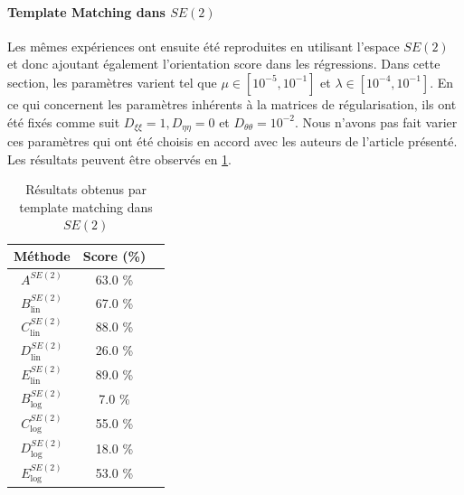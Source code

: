 \documentclass{article}
\begin{document}
\paragraph{Template Matching dans $SE(2)$}
Les mêmes expériences ont ensuite été reproduites en utilisant l'espace $SE(2)$ et donc ajoutant également l'orientation score dans les régressions.
Dans cette section, les paramètres varient tel que $\mu \in [10^{-5}, 10^{-1}]$ et $\lambda \in [10^{-4}, 10^{-1}]$. En ce qui concernent les paramètres inhérents à la matrices de 
régularisation, ils ont été fixés comme suit $D_{\xi \xi}=1, D_{\eta \eta} = 0$ et $D_{\theta \theta} = 10^{-2}$. Nous n'avons pas fait varier ces paramètres qui ont été choisis en accord avec les auteurs 
de l'article présenté. Les résultats peuvent être observés en \ref{table: SE(2)}.

\begin{table}[h!]
    \centering
    \begin{tabular}{|c|c|c|}
        \hline
        Méthode & Score (\%)\\
        \hline
        \hline
        $A^{SE(2)}$&  63.0 \% \\
        \hline
        $B_{\text{lin}}^{SE(2)}$&  67.0    \%   \\
        $C_{\text{lin}}^{SE(2)}$&  88.0    \%   \\
        $D_{\text{lin}}^{SE(2)}$&  26.0   \%   \\
        $E_{\text{lin}}^{SE(2)}$&  89.0    \%   \\
        \hline
        $B_{\text{log}}^{SE(2)} $&  7.0  \%   \\ 
        $C_{\text{log}}^{SE(2)} $&  55.0  \%   \\ 
        $D_{\text{log}}^{SE(2)} $&  18.0 \%   \\ 
        $E_{\text{log}}^{SE(2)} $&  53.0  \%   \\ 
        \hline
    \end{tabular}
    \caption{Résultats obtenus par template matching dans $SE(2)$}
    \label{table: SE(2)}
\end{table}
\end{document}

